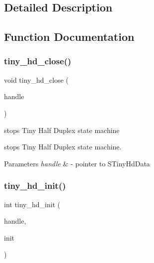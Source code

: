 \subsection{Detailed Description}


\subsection{Function Documentation}
\mbox{\label{group__HALF__DUPLEX__API_ga275846730a88b9654345d5defbda31e7}} 
\subsubsection{\texorpdfstring{tiny\+\_\+hd\+\_\+close()}{tiny\_hd\_close()}}
{\footnotesize\ttfamily void tiny\+\_\+hd\+\_\+close (\begin{DoxyParamCaption}\item[{\hyperlink{tiny__hd_8h_af9f81ad129b754a780dfca5dcd7f7cf9}{S\+Tiny\+Hd\+Data} $\ast$}]{handle }\end{DoxyParamCaption})}



stops Tiny Half Duplex state machine 

stops Tiny Half Duplex state machine.


\begin{DoxyParams}{Parameters}
{\em handle} & -\/ pointer to S\+Tiny\+Hd\+Data \\
\hline
\end{DoxyParams}
\mbox{\label{group__HALF__DUPLEX__API_ga747e6a3a0b5d2a9e1fe0c143c20057e9}} 
\subsubsection{\texorpdfstring{tiny\+\_\+hd\+\_\+init()}{tiny\_hd\_init()}}
{\footnotesize\ttfamily int tiny\+\_\+hd\+\_\+init (\begin{DoxyParamCaption}\item[{\hyperlink{tiny__hd_8h_af9f81ad129b754a780dfca5dcd7f7cf9}{S\+Tiny\+Hd\+Data} $\ast$}]{handle,  }\item[{\hyperlink{tiny__hd_8h_a784f1a0f0ae7f06da4bc288fa3f22408}{S\+Tiny\+Hd\+Init} $\ast$}]{init }\end{DoxyParamCaption})}



